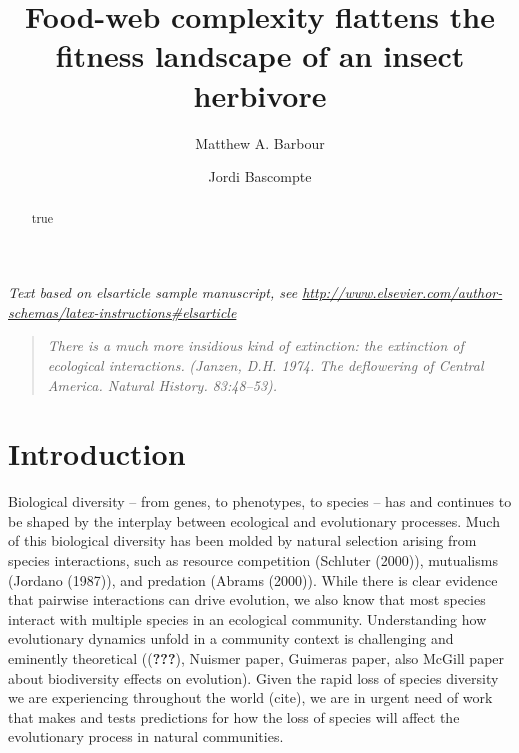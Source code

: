 \documentclass[]{elsarticle} %
\begin{document}
\begin{frontmatter}

  \title{Food-web complexity flattens the fitness landscape of an insect
herbivore}
    \author[Department of Evolutionary Biology and Environmental Studies, University
of Zurich, Zurich, Switzerland]{Matthew A. Barbour}
    \author[Another University]{Jordi Bascompte}
  
      \address[Some Institute of Technology]{Department, Street, City, State, Zip}
    \address[Another University]{Department, Street, City, State, Zip}
  
  \begin{abstract}
  true
  \end{abstract}
  
 \end{frontmatter}

\emph{Text based on elsarticle sample manuscript, see
\url{http://www.elsevier.com/author-schemas/latex-instructions\#elsarticle}}

\begin{quote}
\emph{There is a much more insidious kind of extinction: the extinction
of ecological interactions.} \emph{(Janzen, D.H. 1974. The deflowering
of Central America. Natural History. 83:48--53).}
\end{quote}

\section{Introduction}\label{introduction}

Biological diversity -- from genes, to phenotypes, to species -- has and
continues to be shaped by the interplay between ecological and
evolutionary processes. Much of this biological diversity has been
molded by natural selection arising from species interactions, such as
resource competition (Schluter (2000)), mutualisms (Jordano (1987)), and
predation (Abrams (2000)). While there is clear evidence that pairwise
interactions can drive evolution, we also know that most species
interact with multiple species in an ecological community. Understanding
how evolutionary dynamics unfold in a community context is challenging
and eminently theoretical (({\textbf{???}}), Nuismer paper, Guimeras
paper, also McGill paper about biodiversity effects on evolution). Given
the rapid loss of species diversity we are experiencing throughout the
world (cite), we are in urgent need of work that makes and tests
predictions for how the loss of species will affect the evolutionary
process in natural communities.
\end{document}
